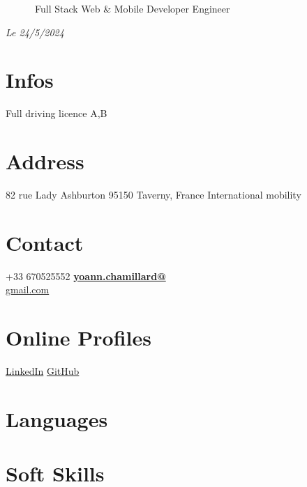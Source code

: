 \documentclass[]{friggeri-cv}
\begin{document}
      {~~~~~~Full Stack Web \& Mobile Developer Engineer}
      {}

\begin{aside}
	\emph{Le 24/5/2024} \hspace*{8mm}
\section{Infos}
Full driving licence A,B
\section{Address}
82 rue Lady Ashburton
95150 Taverny,
France
International mobility
\section{Contact}
+33 670525552
\href{mailto:yoann.chamillard@gmail.com}{\textbf{yoann.chamillard@}\\gmail.com}
\section{Online Profiles}
\href{http://fr.linkedin.com/in/yoannchamillard}{LinkedIn}
\href{https://github.com/Nokheenig?tab=stars}{GitHub}
\section{Languages}
\section{Soft Skills}

\end{aside}
\end{document}
